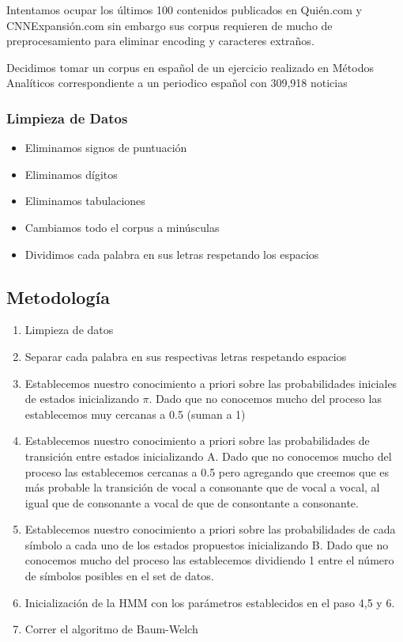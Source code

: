 \documentclass[]{article}
\begin{document}
Intentamos ocupar los últimos 100 contenidos publicados en Quién.com y
CNNExpansión.com sin embargo sus corpus requieren de mucho de
preprocesamiento para eliminar encoding y caracteres extraños.

Decidimos tomar un corpus en español de un ejercicio realizado en
Métodos Analíticos correspondiente a un periodico español con 309,918
noticias

\subsubsection{Limpieza de Datos}\label{limpieza-de-datos}

\begin{itemize}
\itemsep1pt\parskip0pt
\item
  Eliminamos signos de puntuación
\item
  Eliminamos dígitos
\item
  Eliminamos tabulaciones
\item
  Cambiamos todo el corpus a minúsculas
\item
  Dividimos cada palabra en sus letras respetando los espacios
\end{itemize}

\subsection{Metodología}\label{metodologia}

\begin{enumerate}
\def\labelenumi{\arabic{enumi}.}
\itemsep1pt\parskip0pt
\item
  Limpieza de datos
\item
  Separar cada palabra en sus respectivas letras respetando espacios
\item
  Establecemos nuestro conocimiento a priori sobre las probabilidades
  iniciales de estados inicializando $\pi$. Dado que no conocemos mucho
  del proceso las establecemos muy cercanas a 0.5 (suman a 1)
\item
  Establecemos nuestro conocimiento a priori sobre las probabilidades de
  transición entre estados inicializando A. Dado que no conocemos mucho
  del proceso las establecemos cercanas a 0.5 pero agregando que creemos
  que es más probable la transición de vocal a consonante que de vocal a
  vocal, al igual que de consonante a vocal de que de consontante a
  consonante.
\item
  Establecemos nuestro conocimiento a priori sobre las probabilidades de
  cada símbolo a cada uno de los estados propuestos inicializando B.
  Dado que no conocemos mucho del proceso las establecemos dividiendo 1
  entre el número de símbolos posibles en el set de datos.
\item
  Inicialización de la HMM con los parámetros establecidos en el paso
  4,5 y 6.
\item
  Correr el algoritmo de Baum-Welch
\end{enumerate}
\end{document}

